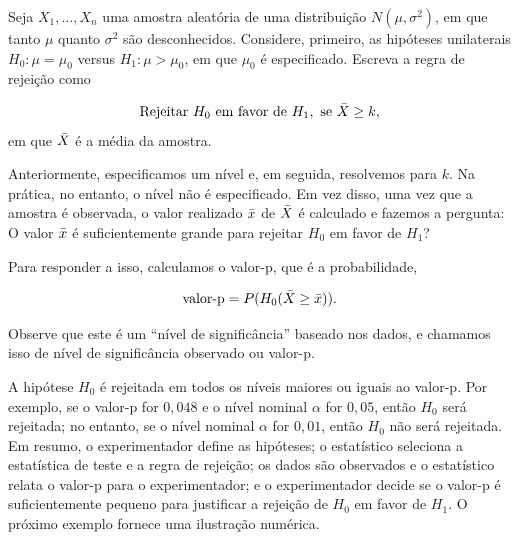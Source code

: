 \documentclass[12pt]{beamer}
\begin{document}
\begin{frame}{}
\begin{block}{}
\justifying
Seja $X_1, \ldots, X_n$ uma amostra aleatória de uma distribuição $N(\mu, \sigma^2)$, em que tanto $\mu$ quanto $\sigma^2$ são desconhecidos. Considere, primeiro, as hipóteses unilaterais $H_0 : \mu = \mu_0$ versus $H_1 : \mu > \mu_0$, em que $\mu_0$ é especificado. Escreva a regra de rejeição como

\begin{align}
\text{Rejeitar } H_0 \text{ em favor de } H_1, \text{ se } \Bar{X} \geq k, 
\end{align}
em que $\Bar{X}$ é a média da amostra.
\end{block}
\pause
\begin{block}{}
\justifying
Anteriormente, especificamos um nível e, em seguida, resolvemos para $k$. Na prática, no entanto, o nível não é especificado. Em vez disso, uma vez que a amostra é observada, o valor realizado $\Bar{x}$ de $\Bar{X}$ é calculado e fazemos a pergunta: O valor $\Bar{x}$ é suficientemente grande para rejeitar $H_0$ em favor de $H_1$? 
\end{block}
\end{frame}

\begin{frame}{}
\begin{block}{}
\justifying
Para responder a isso, calculamos o valor-p, que é a probabilidade,

\begin{align*}
\text{valor-p} = P(H_0 (\Bar{X} \geq \Bar{x})).
\end{align*}

Observe que este é um ``nível de significância'' baseado nos dados, e chamamos isso de nível de significância observado ou valor-p. 
\end{block}
\end{frame}

\begin{frame}{}
\begin{block}{}
\justifying
A hipótese $H_0$ é rejeitada em todos os níveis maiores ou iguais ao valor-p. Por exemplo, se o valor-p for $0,048$ e o nível nominal $\alpha$ for $0,05$, então $H_0$ será rejeitada; no entanto, se o nível nominal $\alpha$ for $0,01$, então $H_0$ não será rejeitada. Em resumo, o experimentador define as hipóteses; o estatístico seleciona a estatística de teste e a regra de rejeição; os dados são observados e o estatístico relata o valor-p para o experimentador; e o experimentador decide se o valor-p é suficientemente pequeno para justificar a rejeição de $H_0$ em favor de $H_1$. O próximo exemplo fornece uma ilustração numérica.
\end{block}
\end{frame}
\end{document}
